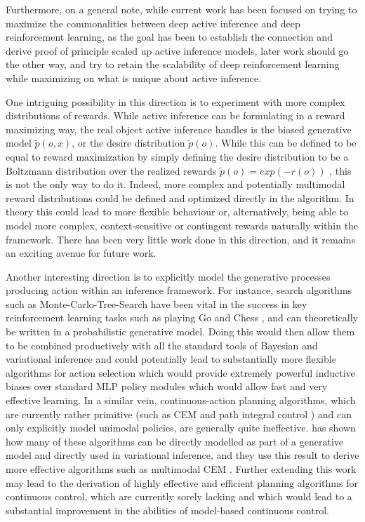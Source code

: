 Furthermore, on a general note, while current work has been focused on trying to maximize the commonalities between deep active inference and deep reinforcement learning, as the goal has been to establish the connection and derive proof of principle scaled up active inference models, later work should go the other way, and try to retain the scalability of deep reinforcement learning while maximizing on what is unique about active inference. 

One intriguing possibility in this direction is to experiment with more complex distributions of rewards. While active inference can be formulating in a reward maximizing way, the real object active inference handles is the biased generative model $\tilde{p}(o,x)$, or the desire distribution $\tilde{p}(o)$. While this can be defined to be equal to reward maximization by simply defining the desire distribution to be a Boltzmann distribution over the realized rewards $\tilde{p}(o) = exp(-r(o))$ \citep{friston2012active}, this is not the only way to do it. Indeed, more complex and potentially multimodal reward distributions could be defined and optimized directly in the algorithm. In theory this could lead to more flexible behaviour or, alternatively, being able to model more complex, context-sensitive or contingent rewards naturally within the framework. There has been very little work done in this direction, and it remains an exciting avenue for future work.

Another interesting direction is to explicitly model the generative processes producing action within an inference framework. For instance, search algorithms such as Monte-Carlo-Tree-Search have been vital in the success in key reinforcement learning tasks such as playing Go and Chess \citep{silver2017mastering}, and can theoretically be written in a probabilistic generative model. Doing this would then allow them to be combined productively with all the standard tools of Bayesian and variational inference and could potentially lead to substantially more flexible algorithms for action selection which would provide extremely powerful inductive biases over standard MLP policy modules which would allow fast and very effective learning. In a similar vein, continuous-action planning algorithms, which are currently rather primitive (such as CEM \citep{rubinstein1997optimization} and path integral control \citep{kappen2007introduction}) and can only explicitly model unimodal policies, are generally quite ineffective. \citet{okada_variational_2019} has shown how many of these algorithms can be directly modelled as part of a generative model and directly used in variational inference, and they use this result to derive more effective algorithms such as multimodal CEM \citep{okada2020planet}. Further extending this work may lead to the derivation of highly effective and efficient planning algorithms for continuous control, which are currently sorely lacking and which would lead to a substantial improvement in the abilities of model-based continuous control. 

